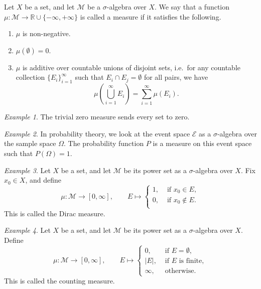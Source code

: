 \documentclass[11pt]{article}
\newcommand{\R}{\mathbb{R}}
\newcommand{\M}{\mathcal{M}}
\theoremstyle{definition}
\theoremstyle{remark}
\newtheorem*{example}{Example}
\numberwithin{equation}{section}
\begin{document}
    \begin{definition}
        Let $X$ be a set, and let $\M$ be a $\sigma$-algebra over $X$. We say
        that a function $\mu\colon \M \to \R \cup \{-\infty, +\infty\}$ is called
        a measure if it satisfies the following.
        \begin{enumerate}
            \itemsep0em
            \item $\mu$ is non-negative.
            \item $\mu(\emptyset) = 0$.
            \item $\mu$ is additive over countable unions of disjoint sets, i.e.\ for
            any countable collection $\{E_i\}_{i = 1}^\infty$ such that $E_i \cap E_j
            = \emptyset$ for all pairs, we have \[
                \mu\left(\bigcup_{i = 1}^\infty E_i\right) = \sum_{i = 1}^\infty
                \mu(E_i).
            \]
        \end{enumerate}
    \end{definition}

    \begin{example}
        The trivial zero measure sends every set to zero.
    \end{example}
    \begin{example}
        In probability theory, we look at the event space $\mathcal{E}$ as a
        $\sigma$-algebra over the sample space $\Omega$. The probability function $P$
        is a measure on this event space such that $P(\Omega) = 1$.
    \end{example}
    \begin{example}
        Let $X$ be a set, and let $\M$ be its power set as a $\sigma$-algebra
        over $X$. Fix $x_0 \in X$, and define \[
            \mu\colon \M \to [0, \infty], \qquad E \mapsto \begin{cases}
                1, &\text{ if } x_0 \in E, \\
                0, &\text{ if } x_0 \notin E. \\
            \end{cases}
        \] This is called the Dirac measure.
    \end{example}

    \begin{example}
        Let $X$ be a set, and let $\M$ be its power set as a $\sigma$-algebra
        over $X$. Define \[
            \mu\colon \M \to [0, \infty], \qquad E \mapsto \begin{cases}
                0, &\text{ if } E = \emptyset, \\
                |E|, &\text{ if } E\text{ is finite},\\
                \infty, &\text{ otherwise}.
            \end{cases}
        \] This is called the counting measure.
    \end{example}
\end{document}
